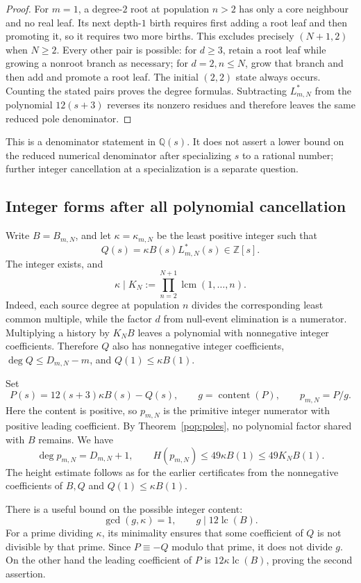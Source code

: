 \begin{proof}
For $m=1$, a degree-$2$ root at population $n>2$ has only a core
neighbour and no real leaf. Its next depth-$1$ birth requires first
adding a root leaf and then promoting it, so it requires two more
births. This excludes precisely $(N+1,2)$ when $N\ge2$. Every
other pair is possible: for $d\ge3$, retain a root leaf while
growing a nonroot branch as necessary; for $d=2,n\le N$, grow
that branch and then add and promote a root leaf. The initial
$(2,2)$ state always occurs. Counting the stated pairs proves the
degree formulas. Subtracting $L^*_{m,N}$ from the polynomial
$12(s+3)$ reverses its nonzero residues and therefore leaves the
same reduced pole denominator.
\end{proof}

This is a denominator statement in $\mathbb Q(s)$. It does not
assert a lower bound on the reduced numerical denominator after
specializing $s$ to a rational number; further integer cancellation
at a specialization is a separate question.

\subsection{Integer forms after all polynomial cancellation}

Write $B=B_{m,N}$, and let $\kappa=\kappa_{m,N}$ be the least
positive integer such that
\[
 Q(s)=\kappa B(s)L^*_{m,N}(s)\in\mathbb Z[s].
\]
The integer exists, and
\[
 \kappa\mid K_N:=\prod_{n=2}^{N+1}\operatorname{lcm}(1,\ldots,n).
\]
Indeed, each source degree at population $n$ divides the corresponding
least common multiple, while the factor $d$ from null-event elimination
is a numerator. Multiplying a history by $K_NB$ leaves a polynomial
with nonnegative integer coefficients. Therefore $Q$ also has
nonnegative integer coefficients, $\deg Q\le D_{m,N}-m$, and
$Q(1)\le\kappa B(1)$.

Set
\[
 P(s)=12(s+3)\kappa B(s)-Q(s),\qquad
 g=\operatorname{content}(P),\qquad p_{m,N}=P/g.
\]
Here the content is positive, so $p_{m,N}$ is the primitive integer
numerator with positive leading coefficient. By Theorem~\ref{pop:poles},
no polynomial factor shared with $B$ remains. We have
\[
 \deg p_{m,N}=D_{m,N}+1,\qquad
 H(p_{m,N})\le49\kappa B(1)\le49K_NB(1).
\]
The height estimate follows as for the earlier certificates from the
nonnegative coefficients of $B,Q$ and $Q(1)\le\kappa B(1)$.

There is a useful bound on the possible integer content:
\begin{equation}\label{pop:content}
 \gcd(g,\kappa)=1,
 \qquad g\mid12\operatorname{lc}(B).
\end{equation}
For a prime dividing $\kappa$, its minimality ensures that some
coefficient of $Q$ is not divisible by that prime. Since
$P\equiv-Q$ modulo that prime, it does not divide $g$. On the
other hand the leading coefficient of $P$ is
$12\kappa\operatorname{lc}(B)$, proving the second assertion.

